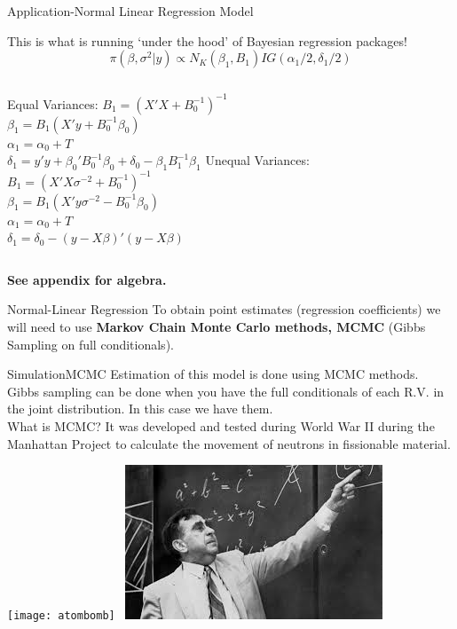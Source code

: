 \documentclass[table]{beamer}
\newcommand{\Bzero}{B_0^{-1}}
\begin{document}
\begin{frame}{Application-Normal Linear Regression Model}

	This is what is running `under the hood' of Bayesian regression packages!
	\[ \pi(\beta,\sigma^2|y) \propto N_K(\beta_1, B_1) IG(\alpha_1/2, \delta_1/2) \]
	\begin{columns}[c]
	Equal Variances:
		 $ B_1 = (X'X + B_0^{-1})^{-1} $ \\
		$ \beta_1 = B_1(X'y + B_0^{-1}\beta_0) $\\
		$ \alpha_1 = \alpha_0 + T $\\
		$ \delta_1 = y'y + \beta_0'\Bzero \beta_0 + \delta_0 - \beta_1 B_1^{-1}\beta_1 $
	Unequal Variances:\\
			$ B_1 = (X'X\sigma^{-2}+B_0^{-1})^{-1} $ \\
			$ \beta_1 = B_1(X'y\sigma^{-2} - B_0^{-1}\beta_0) $\\
			$ \alpha_1 = \alpha_0 + T $\\
			$ \delta_1 = \delta_0 - (y-X\beta)'(y-X\beta) $\\
	\end{columns}
	\bigskip
		\textbf{See appendix for algebra.} 
\end{frame}

\begin{frame}{Normal-Linear Regression}
	To obtain point estimates (regression coefficients) we will need to use \textbf{Markov Chain Monte Carlo methods, MCMC} (Gibbs Sampling on full conditionals).
\end{frame}




\begin{frame}{Simulation}{MCMC}
	Estimation of this model is done using MCMC methods. Gibbs sampling can be done when you have the full conditionals of each R.V. in the joint distribution. In this case we have them.\\
	What is MCMC? It was developed and tested during World War II during the Manhattan Project to calculate the movement of neutrons in fissionable material. \\
	\begin{center}
	\texttt{[image: atombomb]} \ \includegraphics[scale =.44]{edteller}
	 \end{center}
\end{frame}
\end{document}
